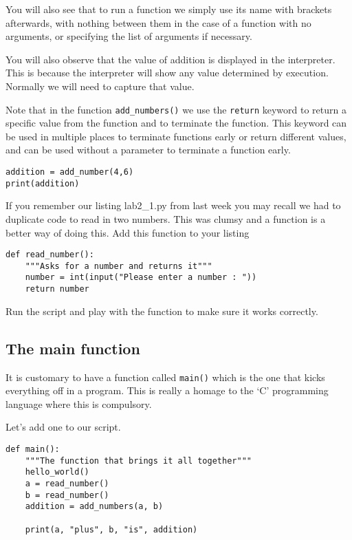 \documentclass[12pt,oneside]{cttutorial}
\begin{document}
You will also see that to run a function we simply use its name with brackets afterwards, with nothing between them in the case of a function with no arguments, or specifying the list of arguments if necessary.

You will also observe that the value of addition is displayed in the interpreter. This is because the interpreter will show any value determined by execution. Normally we will need to capture that value.

Note that in the function \lstinline!add_numbers()! we use the \lstinline!return! keyword to return a specific value from the function and to terminate the function. This keyword can be used in multiple places to terminate functions early or return different values, and can be used without a parameter to terminate a function early.

\begin{lstlisting}
addition = add_number(4,6)
print(addition)
\end{lstlisting}

If you remember our listing lab2\_1.py from last week you may recall we had to duplicate code to read in two numbers. This was clumsy and a function is a better way of doing this. Add this function to your listing

\begin{lstlisting}
def read_number():
    """Asks for a number and returns it"""
    number = int(input("Please enter a number : "))
    return number
\end{lstlisting}

Run the script and play with the function to make sure it works correctly.

\subsection{The main function}

It is customary to have a function called \lstinline!main()! which is the one that kicks everything off in a program. This is really a homage to the `C' programming language where this is compulsory.

Let's add one to our script.

\begin{lstlisting}
def main():
    """The function that brings it all together"""
    hello_world()
    a = read_number()
    b = read_number()
    addition = add_numbers(a, b)

    print(a, "plus", b, "is", addition)
\end{lstlisting}
\end{document}
